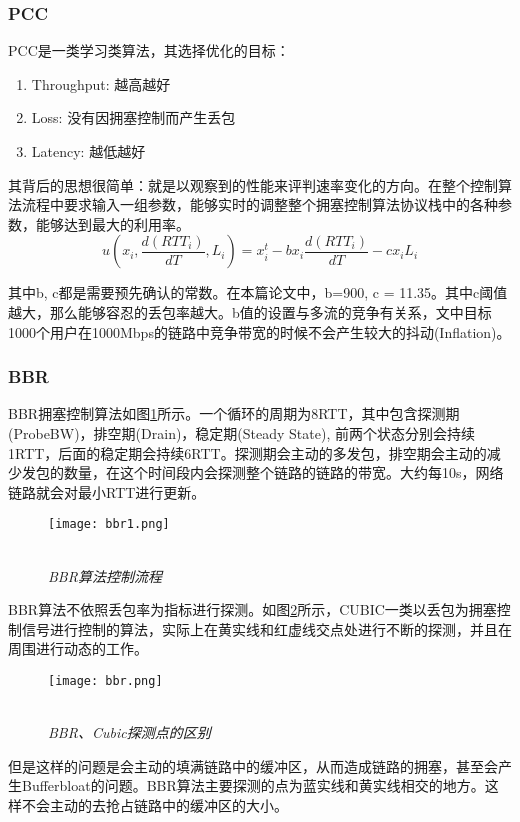 \documentclass[a4paper, 12pt, UTF8]{ctexart}
\begin{document}
\subsubsection{PCC}
\par PCC\cite{DongMZAGGS18}是一类学习类算法，其选择优化的目标：
\begin{enumerate}
	\item Throughput: 越高越好
	\item Loss: 没有因拥塞控制而产生丢包
	\item Latency: 越低越好
\end{enumerate}
\par 其背后的思想很简单：就是以观察到的性能来评判速率变化的方向。在整个控制算法流程中要求输入一组参数，能够实时的调整整个拥塞控制算法协议栈中的各种参数，能够达到最大的利用率。
$$
u(x_i, \frac{d(RTT_i)}{dT}, L_i) = x_i^t-bx_i\frac{d(RTT_i)}{dT}-cx_iL_i
$$
\par 其中b, c都是需要预先确认的常数。在本篇论文中，b=900, c = 11.35。其中c阈值越大，那么能够容忍的丢包率越大。b值的设置与多流的竞争有关系，文中目标1000个用户在1000Mbps的链路中竞争带宽的时候不会产生较大的抖动(Inflation)。

\subsubsection{BBR}
\par BBR\cite{DBLP:journals/queue/CardwellCGYJ16}拥塞控制算法如图\ref{fig:BBR process}所示。一个循环的周期为8RTT，其中包含探测期(ProbeBW)，排空期(Drain)，稳定期(Steady State), 前两个状态分别会持续1RTT，后面的稳定期会持续6RTT。探测期会主动的多发包，排空期会主动的减少发包的数量，在这个时间段内会探测整个链路的链路的带宽。大约每10s，网络链路就会对最小RTT进行更新。

\begin{figure}[H]
	\centering \texttt{[image: bbr1.png]}
	\\ \hspace*{\fill} \\
	\caption{\em BBR算法控制流程}
	\label{fig:BBR process}
\end{figure}

\par BBR算法不依照丢包率为指标进行探测。如图\ref{fig:BBR algorithm}所示，CUBIC一类以丢包为拥塞控制信号进行控制的算法，实际上在黄实线和红虚线交点处进行不断的探测，并且在周围进行动态的工作。

\begin{figure}[ht]
	\centering \texttt{[image: bbr.png]}
	\\ \hspace*{\fill} \\
	\caption{\em BBR、Cubic探测点的区别}
	\label{fig:BBR algorithm}
\end{figure}
\par 但是这样的问题是会主动的填满链路中的缓冲区，从而造成链路的拥塞，甚至会产生Bufferbloat的问题。BBR算法主要探测的点为蓝实线和黄实线相交的地方。这样不会主动的去抢占链路中的缓冲区的大小。
\end{document}
